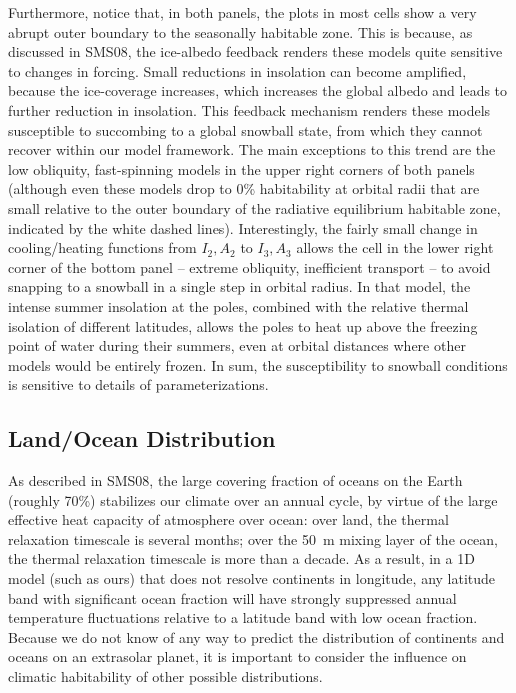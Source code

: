 Furthermore, notice that, in both panels, the plots in most cells show
a very abrupt outer boundary to the seasonally habitable zone.  This
is because, as discussed in SMS08, the ice-albedo feedback renders
these models quite sensitive to changes in forcing.  Small reductions
in insolation can become amplified, because the ice-coverage
increases, which increases the global albedo and leads to further
reduction in insolation.  This feedback mechanism renders these models
susceptible to succombing to a global snowball state, from which they
cannot recover within our model framework.  The main exceptions to
this trend are the low obliquity, fast-spinning models in the upper
right corners of both panels (although even these models drop to 0\%
habitability at orbital radii that are small relative to the outer
boundary of the radiative equilibrium habitable zone, indicated by the
white dashed lines).  Interestingly, the fairly small change in
cooling/heating functions from $I_2,A_2$ to $I_3,A_3$ allows the cell
in the lower right corner of the bottom panel -- extreme obliquity,
inefficient transport -- to avoid snapping to a snowball in a single
step in orbital radius.  In that model, the intense summer insolation
at the poles, combined with the relative thermal isolation of
different latitudes, allows the poles to heat up above the freezing
point of water during their summers, even at orbital distances where
other models would be entirely frozen.  In sum, the susceptibility to
snowball conditions is sensitive to details of parameterizations.


\subsection{Land/Ocean Distribution}
\label{obl_ssec:ocean distribution}

As described in SMS08, the large covering fraction of oceans on the
Earth (roughly 70\%) stabilizes our climate over an annual cycle, by
virtue of the large effective heat capacity of atmosphere over ocean:
over land, the thermal relaxation timescale is several months; over
the 50~m mixing layer of the ocean, the thermal relaxation timescale
is more than a decade.  As a result, in a 1D model (such as ours) that
does not resolve continents in longitude, any latitude band with
significant ocean fraction will have strongly suppressed annual
temperature fluctuations relative to a latitude band with low ocean
fraction.  Because we do not know of any way to predict the
distribution of continents and oceans on an extrasolar planet, it is
important to consider the influence on climatic habitability of other
possible distributions.

